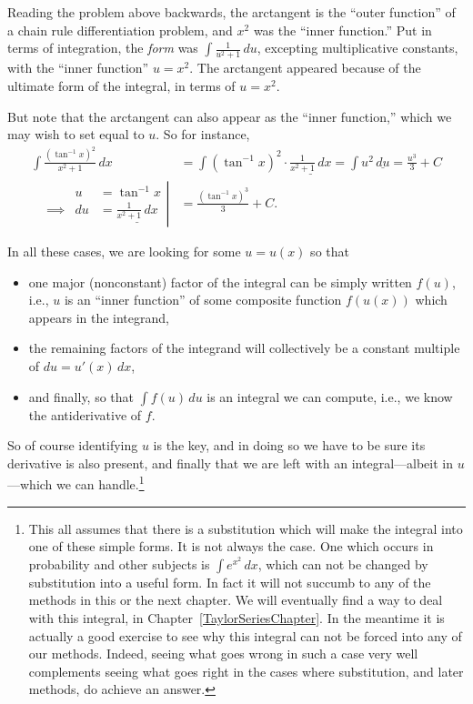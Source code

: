 Reading the problem above backwards,
the arctangent is the ``outer function'' of a chain
rule differentiation problem, and $x^2$ was the ``inner function.''
Put in terms of integration, the {\it form} was $\int\frac1{u^2+1}\,du$,
excepting multiplicative constants, with the ``inner function'' 
$u=x^2$.  The arctangent appeared because of the ultimate form
of the integral, in terms of $u=x^2$.

But note that the arctangent can also appear as the ``inner function,''
which we may wish to set equal to $u$. So for instance,
\begin{align*}
\int\frac{\left(\tan^{-1}x\right)^2}{x^2+1}\,dx
 &=\int\left(\tan^{-1}x\right)^2\cdot\underline{\frac1{x^2+1}\,dx}
 =\int u^2\,\underline{du}=\frac{u^3}3+C\\
\left.\begin{alignedat}{2}
 &&u&=\tan^{-1}x\\
&\implies&du&=\underline{\frac1{x^2+1}\,dx}\end{alignedat}\right|
&=\frac{\left(\tan^{-1}x\right)^3}3+C.\end{align*}

In all these cases, we are looking for some $u=u(x)$ so that
\begin{itemize}
\item one major (nonconstant) factor of the integral can be simply 
 written $f(u)$, i.e., $u$ is an ``inner function'' of some
 composite function $f(u(x))$ which appears in the integrand,
\item the remaining factors of the integrand will collectively
  be a constant multiple of $du=u'(x)\,dx$, 
\item and finally, so that $\int f(u)\,du$ is an integral we can
  compute, i.e., we know the antiderivative of $f$.
\end{itemize}
So of course identifying $u$ is the key, and in doing so we have to
be sure its derivative is also present, and finally that we are
left with an integral---albeit in $u$---which we can handle.\footnote{%
This all assumes that there is a substitution which will make
the integral into one of these simple forms.  It is not always the
case.  One which occurs in probability and other subjects
is $\int e^{x^2}\,dx$, which can not be changed by substitution into
a useful form.  In fact it will not succumb to any of the methods in
this or the next chapter.  We will eventually find a way to 
deal with this integral, in Chapter~\ref{TaylorSeriesChapter}.
In the meantime it is actually a good exercise to see why this
integral can not be forced into any of our methods.  Indeed, 
seeing what goes wrong in such a case very well complements
seeing what goes right in the cases where substitution,
and later methods, do achieve an answer.%
}
